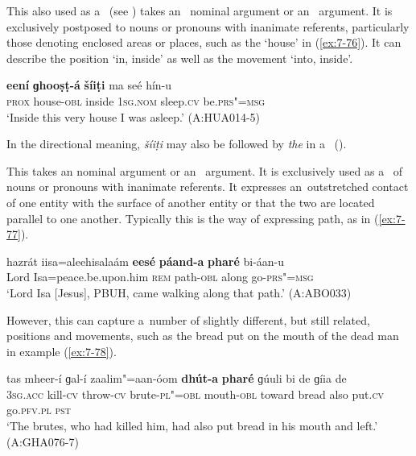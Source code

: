 \begin{exe}
 This  also used as a~ (see ) takes an~ nominal argument or an~  argument. It is exclusively postposed to nouns or pronouns with inanimate referents, particularly those denoting enclosed areas or places, such as the `house' in (\ref{ex:7-76}). It can describe the position `in, inside' as well as the movement `into, inside'.

\begin{exe}
\ex
\label{ex:7-76}
\gll \textbf{eení} \textbf{ɡhooṣṭ-á} \textbf{šíiṭi} ma seé hín-u  \\
\textsc{prox} house-\textsc{obl}  inside \textsc{1sg.nom} sleep.\textsc{cv} be.\textsc{prs"=msg}  \\
\glt `Inside this very house I was asleep.' (A:HUA014-5)
\end{exe}

In the directional meaning, \textit{šíiṭi} may also be followed by \textit{the} in a~ ().


 This  takes an  nominal argument or an~  argument. It is exclusively used as a~ of nouns or pronouns with inanimate referents. It expresses an~outstretched contact of one entity with the surface of another entity or that the two are located parallel to one another. Typically this is the way of expressing path, as in (\ref{ex:7-77}).

\begin{exe}
\ex
\label{ex:7-77}
\gll hazrát iisa=aleehisalaám \textbf{eesé} \textbf{páand-a} \textbf{pharé} bi-áan-u\\
Lord Isa=peace.be.upon.him \textsc{rem} path-\textsc{obl} along go-\textsc{prs"=msg}\\
\glt `Lord Isa [Jesus], PBUH, came walking along that path.' (A:ABO033)
\end{exe}

However, this  can capture a~number of slightly different, but still related, positions and movements, such as the bread put on the mouth of the dead man in example (\ref{ex:7-78}). 

\begin{exe}
\ex
\label{ex:7-78}
\gll tas mheer-í ɡal-í zaalim"=aan-óom \textbf{dhút-a} \textbf{pharé} ɡúuli bi de ɡíia de \\
\textsc{3sg.acc} kill-\textsc{cv} throw-\textsc{cv} brute-\textsc{pl"=obl} mouth-\textsc{obl} toward bread also put.\textsc{cv} go.\textsc{pfv.pl} \textsc{pst} \\
\glt `The brutes, who had killed him, had also put bread in his mouth and left.' (A:GHA076-7)
\end{exe}


\end{exe}
